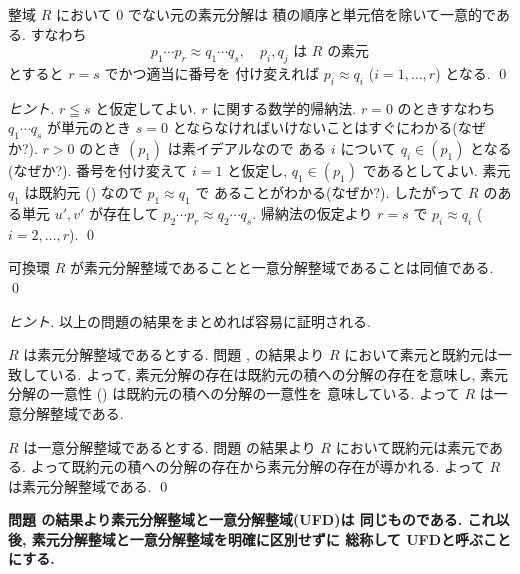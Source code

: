 \documentclass[12pt,twoside]{jarticle}
\begin{document}
\begin{question}[整域における素元分解の一意性]
\label{q:D=>unique}
 整域 $R$ において $0$ でない元の素元分解は
 積の順序と単元倍を除いて一意的である.
 すなわち
 \begin{equation*}
  p_1\cdots p_r \approx q_1\cdots q_s, 
  \quad
  \text{$p_i,q_j$ は $R$ の素元}
 \end{equation*}
 とすると $r=s$ でかつ適当に番号を
 付け変えれば $p_i\approx q_i$ ($i=1,\ldots,r$) となる.
 \qed
\end{question}

\begin{proof}[ヒント]
 $r\leqq s$ と仮定してよい. $r$ に関する数学的帰納法.
 $r=0$ のときすなわち $q_1\cdots q_s$ が単元のとき %
 $s=0$ とならなければいけないことはすぐにわかる(なぜか?).
 $r>0$ のとき $(p_1)$ は素イデアルなので
 ある $i$ について $q_i\in(p_1)$ となる(なぜか?).
 番号を付け変えて $i=1$ と仮定し, $q_1\in(p_1)$ であるとしてよい.
 素元 $q_1$ は既約元 () なので $p_1\approx q_1$ で
 あることがわかる(なぜか?).
 したがって $R$ のある単元 $u',v'$ が存在して %
 $p_2\cdots p_r\approx q_2\cdots q_s$.
 帰納法の仮定より $r=s$ で $p_i\approx q_i$ ($i=2,\ldots,r$).
 \qed
\end{proof}

\begin{question}
\label{q:FD=UFD}
 可換環 $R$ が素元分解整域であることと一意分解整域であることは同値である.
 \qed
\end{question}

\begin{proof}[ヒント]
 以上の問題の結果をまとめれば容易に証明される. 

 $R$ は素元分解整域であるとする. 
 問題 ,  の結果より %
 $R$ において素元と既約元は一致している. よって, 
 素元分解の存在は既約元の積への分解の存在を意味し, 
 素元分解の一意性 () は既約元の積への分解の一意性を
 意味している. よって $R$ は一意分解整域である.

 $R$ は一意分解整域であるとする.
 問題  の結果より $R$ において既約元は素元である.
 よって既約元の積への分解の存在から素元分解の存在が導かれる.
 よって $R$ は素元分解整域である.
 \qed
\end{proof}

{\bf 問題  の結果より素元分解整域と一意分解整域(UFD)は
同じものである. これ以後, 素元分解整域と一意分解整域を明確に区別せずに 
総称して UFDと呼ぶことにする.}
\end{document}
